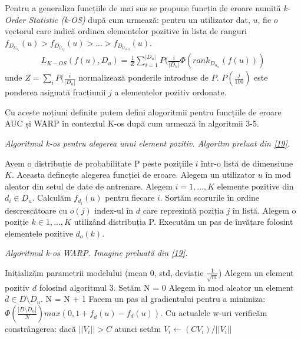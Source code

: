Pentru a generaliza funcțiile de mai sus se propune funcția de eroare numită \textit{k-Order Statistic (k-OS)} după cum urmează: pentru un utilizator dat, $u$, fie $o$ vectorul care indică ordinea elementelor pozitive în lista de ranguri $f_{D_{U_{o_1}}}(u) > f_{D_{U_{o_2}}}(u) > ... > f_{D_{U_{o{|s|}}}}(u)$.
\begin{align}
	L_{K-OS}(f(u),D_u) = \frac{1}{Z} \sum_{i=1}^{|D_u|}P(\frac{i}{|D_u|}\Phi(rank_{D_{u_{o_i}}}(f(u)))
\end{align}
unde $Z = \sum_iP(\frac{i}{|D_u|}$ normalizează ponderile introduse de $P$. $P(\frac{j}{100})$ este ponderea asignată fracțiunii $j$ a elementelor pozitiv ordonate. 

Cu aceste noțiuni definite putem defini alogoritmii pentru funcțiile de eroare AUC și WARP în contextul K-os după cum urmează în algoritmii 3-5.
\begin{algorithm}[!h]
\caption[Algoritmul k-os pentru alegerea unui element pozitiv]{\textit{Algoritmul k-os pentru alegerea unui element pozitiv. Algoritm preluat din \hyperlink{jasonkos}{[19]}.}}
\begin{algorithmic}[!h]
    \State Avem o distribuție de probabilitate P peste pozițiile $i$ într-o listă de dimensiune $K$. Aceasta definește alegerea funcției de eroare.
   	\State Alegem un utilizator $u$ în mod aleator din setul de date de antrenare.
   	\State Alegem $i=1,...,K$ elemente pozitive din $d_i \in D_u$.
   	\State Calculăm $f_{d_i}(u)$ pentru fiecare $i$.
   	\State Sortăm scorurile în ordine descrescătoare cu $o(j)$ index-ul în $d$ care reprezintă poziția $j$ în listă.
   	\State Alegem o poziție $k \in 1,...,K$ utilizând distribuția P.
   	\State Executăm un pas de învățare folosint elementele pozitive $d_o(k)$.
\EndProcedure
\end{algorithmic}
\end{algorithm}

\begin{algorithm}[!h]
\caption[Algoritmul k-os WARP]{\textit{Algoritmul k-os WARP. Imagine preluată din \hyperlink{jasonkos}{[19]}.}}
\begin{algorithmic}[!h]
    \State Inițializăm parametrii modelului (mean 0, std, deviație $\frac{1}{\sqrt{m}}$)
    \Repeat
    \State Alegem un element pozitiv $d$ folosind algoritmul 3.
    \State Setăm N = 0
    \Repeat
    \State Alegem în mod aleator un element $\bar{d} \in D \setminus D_u$.
    \State N = N + 1
        \State Facem un pas al gradientului pentru a minimiza:
        \State $\Phi(\frac{|D \setminus D_u|}{N})max(0, 1 + f_{\bar{d}}(u) - f_d(u))$.
        \State Cu actualele w-uri verificăm constrângerea: dacă $|| V_i || > C$ atunci setăm $V_i \leftarrow (CV_i)/||V_i||$
    \EndIf
\EndProcedure
\end{algorithmic}
\end{algorithm}


